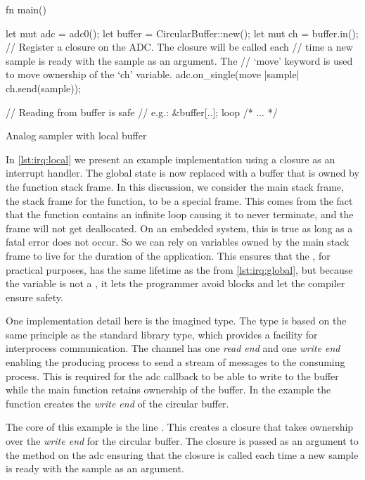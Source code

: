 \begin{listing}[H]
  \begin{rustcode}
fn main() {
  let mut adc = adc0();
  let buffer = CircularBuffer::new();
  let mut ch = buffer.in();
  // Register a closure on the ADC. The closure will be called each
  // time a new sample is ready with the sample as an argument. The
  // `move' keyword is used to move ownership of the `ch' variable.
  adc.on_single(move |sample| ch.send(sample));

  // Reading from buffer is safe
  // e.g.: &buffer[..];
  loop { /* ... */ }
}
  \end{rustcode}
  \caption{Analog sampler with local buffer}
  \label{lst:irq:local}
\end{listing}

In \autoref{lst:irq:local} we present an example implementation using a closure as an interrupt handler.
The global state is now replaced with a buffer that is owned by the  function stack frame.
In this discussion, we consider the main stack frame, the stack frame for the  function, to be a special frame.
This comes from the fact that the  function contains an infinite loop causing it to never terminate, and the frame will not get deallocated.
On an embedded system, this is true as long as a fatal error does not occur.
So we can rely on variables owned by the main stack frame to live for the duration of the application.
This ensures that the , for practical purposes, has the same lifetime as the  from \autoref{lst:irq:global}, but because the variable is not a , it lets the programmer avoid {\unsafe} blocks and let the compiler ensure safety.

One implementation detail here is the imagined  type.
The type is based on the same principle as the {\rust} standard library  type, which provides a facility for interprocess communication.
The channel has one \textit{read end} and one \textit{write end} enabling the producing process to send a stream of messages to the consuming process.
This is required for the \gls{adc} callback to be able to write to the buffer while the main function retains ownership of the buffer.
In the example the  function creates the \textit{write end} of the circular buffer.

The core of this example is the line .
This creates a closure that takes ownership over the \textit{write end} for the circular buffer.
The closure is passed as an argument to the  method on the \gls{adc} ensuring that the closure is called each time a new sample is ready with the sample as an argument.

